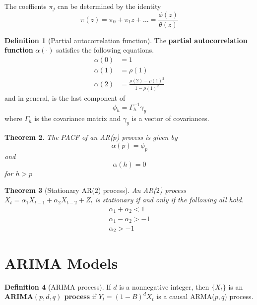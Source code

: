 \documentclass[10pt, oneside, reqno]{amsart}
\theoremstyle{plain}%
\newtheorem{thm}{Theorem}[section]
\theoremstyle{definition}
\newtheorem{defn}[thm]{Definition}
\theoremstyle{remark}
\begin{document}
The coeffients $\pi_j$ can be determined by the identity \[
	\pi(z) = \pi_0 + \pi_1 z + \dots = \frac{\phi(z)}{\theta(z)}
	\]


\begin{defn}[Partial autocorrelation function]
	The \textbf{partial autocorrelation function} $\alpha(\cdot)$ satisfies the following equations.
	\begin{align*}
		\alpha(0) &= 1\\
		\alpha(1) &= \rho(1) \\
		\alpha(2) &= \frac{\rho(2) - \rho(1)^2}{1 - \rho(1)^2}
	\end{align*}
	and in general, is the last component of \[
		\phi_h  =\Gamma_h^{-1} \gamma_y
	\] where $\Gamma_h$ is the covariance matrix and $\gamma_y$ is a vector of covariances. 
\end{defn}

\begin{thm}
	The PACF of an AR($p$) process is given by \[
		\alpha(p) = \phi_p
	\]
	and \[
		\alpha(h) = 0
	\] for $h > p$
\end{thm}


\begin{thm}[Stationary AR($2$) process]
	An AR($2$) process $X_t = \alpha_1 X_{t-1} + \alpha_2 X_{t-2} + Z_t$ is stationary if and only if the following all hold.
	\begin{align*}
		\alpha_1 + \alpha_2 < 1 \\
		\alpha_1 - \alpha_2 > -1 \\
		\alpha_2 > -1
	\end{align*}
\end{thm}


\section{ARIMA Models} %
\label{sec:arima_models}

\begin{defn}[ARIMA process]
	If $d$ is a nonnegative integer, then $\{X_t\}$ is an \textbf{ARIMA$(p,d,q)$ process} if $Y_t = (1-B)^d X_t$ is a causal ARMA($p,q$) process.
\end{defn}

\end{document}
